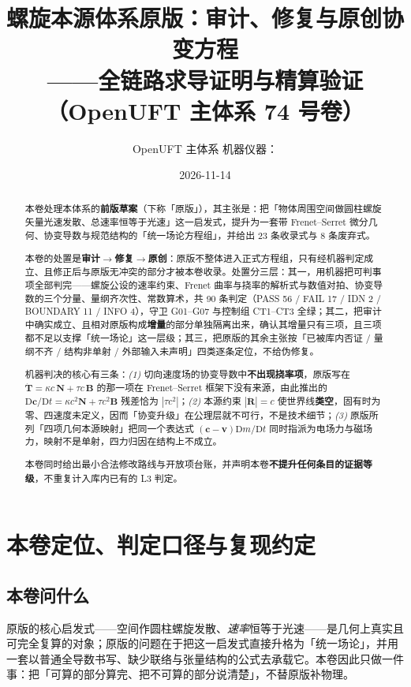 \documentclass[UTF8,fontset=fandol,11pt]{ctexart}
\title{\bfseries 螺旋本源体系原版：审计、修复与原创协变方程\\
\large ——全链路求导证明与精算验证（OpenUFT 主体系 74 号卷）}
\author{OpenUFT 主体系 \quad 机器仪器：\code{74\_helix\_covariant\_audit.py}}
\date{2026-11-14}
\newcommand{\DD}{\mathrm{D}}
\newcommand{\bx}{\boldsymbol}
\begin{document}
\maketitle

\begin{abstract}
\noindent
本卷处理本体系的\textbf{前版草案}（下称「原版」），其主张是：把「物体周围空间做圆柱螺旋矢量光速发散、总速率恒等于光速」这一启发式，提升为一套带 Frenet--Serret 微分几何、协变导数与规范结构的「统一场论方程组」，并给出 23 条收录式与 8 条废弃式。

本卷的处置是\textbf{审计$\to$修复$\to$原创}：原版不整体进入正式方程组，只有经机器判定成立、且修正后与原版无冲突的部分才被本卷收录。处置分三层：其一，用机器把可判事项全部判完——螺旋公设的速率约束、Frenet 曲率与挠率的解析式与数值对拍、协变导数的三个分量、量纲齐次性、常数算术，共 90 条判定（PASS 56 / FAIL 17 / IDN 2 / BOUNDARY 11 / INFO 4），守卫 G01--G07 与控制组 CT1--CT3 全绿；其二，把审计中确实成立、且相对原版构成\textbf{增量}的部分单独隔离出来，确认其增量只有三项，且三项都不足以支撑「统一场论」这一层级；其三，把原版的其余主张按「已被库内否证 / 量纲不齐 / 结构非单射 / 外部输入未声明」四类逐条定位，不给伪修复。

机器判决的核心有三条：\emph{(1)} 切向速度场的协变导数中\textbf{不出现挠率项}，原版写在 $\dot{\bx T}=\kappa c\,\bx N+\tau c\,\bx B$ 的那一项在 Frenet--Serret 框架下没有来源，由此推出的 $\DD\bx c/\DD t=\kappa c^2\bx N+\tau c^2\bx B$ 残差恰为 $|\tau c^2|$；\emph{(2)} 本源约束 $|\dot{\bx R}|=c$ 使世界线\textbf{类空}，固有时为零、四速度未定义，因而「协变升级」在公理层就不可行，不是技术细节；\emph{(3)} 原版所列「四项几何本源映射」把同一个表达式 $(\bx c-\bx v)\DD m/\DD t$ 同时指派为电场力与磁场力，映射不是单射，四力归因在结构上不成立。

本卷同时给出最小合法修改路线与开放项台账，并声明本卷\textbf{不提升任何条目的证据等级}，不重复计入库内已有的 L3 判定。
\end{abstract}

\tableofcontents

\section{本卷定位、判定口径与复现约定}
\label{sec:scope}

\subsection{本卷问什么}
原版的核心启发式——空间作圆柱螺旋发散、\emph{速率}恒等于光速——是几何上真实且可完全复算的对象；原版的问题在于把这一启发式直接升格为「统一场论」，并用一套以普通全导数书写、缺少联络与张量结构的公式去承载它。本卷因此只做一件事：把「可算的部分算完、把不可算的部分说清楚」，不替原版补物理。
\end{document}

